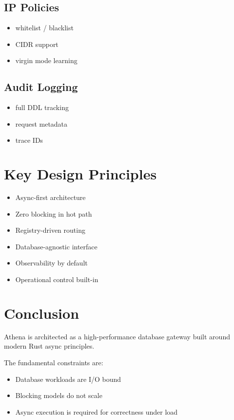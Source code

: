\documentclass[11pt,a4paper]{article}
\begin{document}
\subsection{IP Policies}

\begin{itemize}
\item whitelist / blacklist
\item CIDR support
\item virgin mode learning
\end{itemize}

\subsection{Audit Logging}

\begin{itemize}
\item full DDL tracking
\item request metadata
\item trace IDs
\end{itemize}

\newpage

\section{Key Design Principles}

\begin{itemize}
\item Async-first architecture
\item Zero blocking in hot path
\item Registry-driven routing
\item Database-agnostic interface
\item Observability by default
\item Operational control built-in
\end{itemize}

\newpage

\section{Conclusion}

Athena is architected as a high-performance database gateway built around modern Rust async principles.

The fundamental constraints are:

\begin{itemize}
\item Database workloads are I/O bound
\item Blocking models do not scale
\item Async execution is required for correctness under load
\end{itemize}
\end{document}
